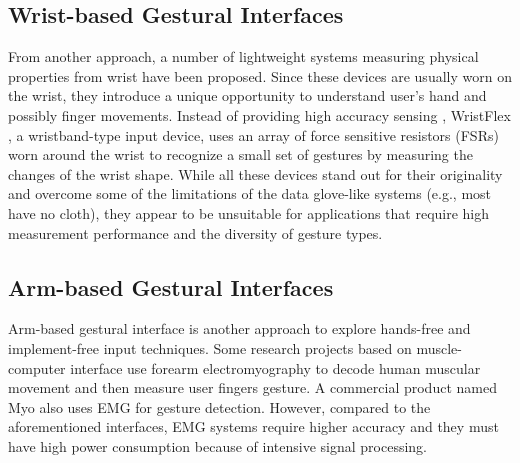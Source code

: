 \documentclass{sigchi}
\begin{document}
\subsection{Wrist-based Gestural Interfaces}


From another approach, a number of lightweight systems measuring physical properties from wrist have been proposed. Since these devices are usually worn on the wrist, they introduce a unique opportunity to understand user's hand and possibly finger movements. Instead of providing high accuracy sensing , WristFlex \cite{Dementyev:2014:WLG:2642918.2647396}, a wristband-type input device, uses an array of force sensitive resistors (FSRs) worn around the wrist to recognize a small set of gestures by measuring the changes of the wrist shape. While all these devices stand out for their originality and overcome some of the limitations of the data glove-like systems (e.g., most have no cloth), they appear to be unsuitable for applications that require high measurement performance and the diversity of gesture types.


\subsection{Arm-based Gestural Interfaces}

Arm-based gestural interface is another approach to explore hands-free and implement-free input techniques. Some research projects based on muscle-computer interface \cite{Saponas:2009:EAI:1622176.1622208} use forearm electromyography to decode human muscular movement and then measure user fingers gesture. A commercial product named Myo \cite{Myo} also uses EMG for gesture detection. However, compared to the aforementioned interfaces, EMG systems require higher accuracy and they must have high power consumption because of intensive signal processing.  
\end{document}
